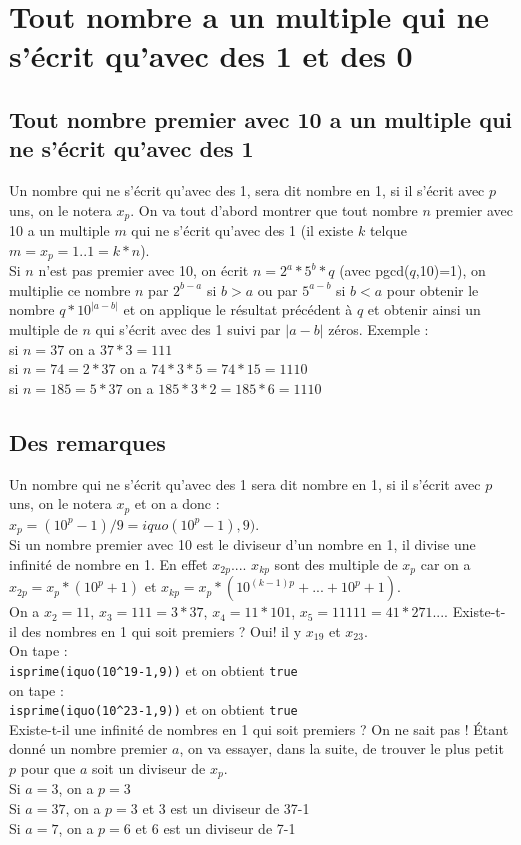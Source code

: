 \documentclass[a4paper,11pt]{book}
\begin{document}
\section{Tout nombre a un multiple qui ne s'\'ecrit qu'avec des 1 et des 0}
\subsection{Tout nombre premier avec 10 a un multiple qui ne s'\'ecrit qu'avec des 1}
Un nombre qui ne s'\'ecrit qu'avec des 1, sera dit nombre en 1, si il s'\'ecrit
avec $p$ uns, on le notera $x_p$.
On va tout d'abord montrer que tout nombre $n$ premier avec 10 a un multiple 
$m$ qui ne s'\'ecrit qu'avec des 1 (il existe $k$ telque $m=x_p=1..1=k*n$).\\
Si $n$ n'est pas premier avec 10, on \'ecrit $n=2^a*5^b*q$ 
(avec pgcd($q$,10)=1), on multiplie ce nombre $n$ par 
 $2^{b-a}$ si $b>a$ ou par  $5^{a-b}$ si $b<a$  pour obtenir le nombre 
 $q*10^{|a-b|}$ et on applique le r\'esultat pr\'ec\'edent \`a $q$ et obtenir 
ainsi un multiple de $n$ qui s'\'ecrit avec des 1 suivi par $|a-b|$ z\'eros.
Exemple :\\
si $n=37$ on a $37*3=111$\\
si $n=74=2*37$ on a $74*3*5=74*15=1110$\\
si $n=185=5*37$ on a $185*3*2=185*6=1110$\\
\subsection{Des remarques}
Un nombre qui ne s'\'ecrit qu'avec des 1 sera dit nombre en 1, si il 
s'\'ecrit avec $p$ uns, on le notera $x_p$ et on a donc :\\
$x_p=(10^p-1)/9=iquo(10^p-1),9)$.\\
Si un nombre premier avec 10 est le diviseur d'un nombre en 1, il divise une 
infinit\'e de nombre en 1. En effet
$x_{2p}$.... $x_{kp}$ sont des multiple de $x_p$ car on a $x_{2p}=x_p*(10^p+1)$
et $x_{kp}=x_p*(10^{(k-1)p}+...+10^p+1)$.\\
On a $x_2=11$, $x_3=111=3*37$, $x_4=11*101$, $x_5=11111=41*271$....
Existe-t-il des nombres en 1 qui soit premiers ?
Oui! il y $x_{19}$ et $x_{23}$.\\
 On tape :\\
{\tt isprime(iquo(10\verb|^|19-1,9))} et on obtient {\tt true}\\
on tape :\\
{\tt isprime(iquo(10\verb|^|23-1,9))} et on obtient {\tt true}\\
Existe-t-il une infinit\'e de nombres en 1 qui soit premiers ?
On ne sait pas !
\'Etant donn\'e un nombre premier $a$, on va essayer, dans la suite, de trouver
le  plus petit $p$ pour que $a$ soit un diviseur de $x_p$.\\ 
Si $a=3$, on a $p=3$\\
Si $a=37$, on a $p=3$ et 3 est un diviseur de 37-1\\
Si $a=7$, on a $p=6$ et 6 est un diviseur de 7-1\\
\end{document}

